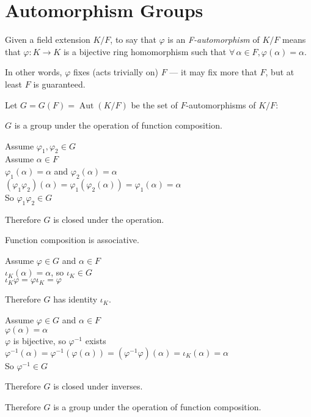 \documentclass[letterpaper,12pt,fleqn]{article}
\newcommand{\vp}{\varphi}
\renewcommand{\a}{\alpha}
\renewcommand{\i}{\iota}
\DeclareMathOperator{\Aut}{Aut}
\begin{document}
\section*{Automorphism Groups}

\begin{definition}[Automorphism]
  Given a field extension $K/F$, to say that $\vp$ is an \emph{F-automorphism}
  of $K/F$ means that $\vp:K\to K$ is a bijective ring homomorphism such that
  $\forall\,\a\in F,\vp(\a)=\a$.

  In other words, $\vp$ fixes (acts trivially on) $F$ --- it may fix more
  that $F$, but at least $F$ is guaranteed.
\end{definition}

\begin{theorem}
  Let $G=G(F)=\Aut(K/F)$ be the set of $F$-automorphisms of $K/F$:

  $G$ is a group under the operation of function composition.
\end{theorem}

\begin{theproof}
  Assume $\vp_1,\vp_2\in G$ \\
  Assume $\a\in F$ \\
  $\vp_1(\a)=\a$ and $\vp_2(\a)=\a$ \\
  $(\vp_1\vp_2)(\a)=\vp_1(\vp_2(\a))=\vp_1(\a)=\a$ \\
  So $\vp_1\vp_2\in G$

  Therefore $G$ is closed under the operation.

  Function composition is associative.

  Assume $\vp\in G$ and $\a\in F$ \\
  $\i_K(\a)=\a$, so $\i_K\in G$ \\
  $\i_K\vp=\vp\i_K=\vp$

  Therefore $G$ has identity $\i_K$.

  Assume $\vp\in G$ and $\a\in F$ \\
  $\vp(\a)=\a$ \\
  $\vp$ is bijective, so $\vp^{-1}$ exists \\
  $\vp^{-1}(\a)=\vp^{-1}(\vp(\a))=(\vp^{-1}\vp)(\a)=\i_K(\a)=\a$ \\
  So $\vp^{-1}\in G$

  Therefore $G$ is closed under inverses.

  Therefore $G$ is a group under the operation of function composition.
\end{theproof}
\end{document}
